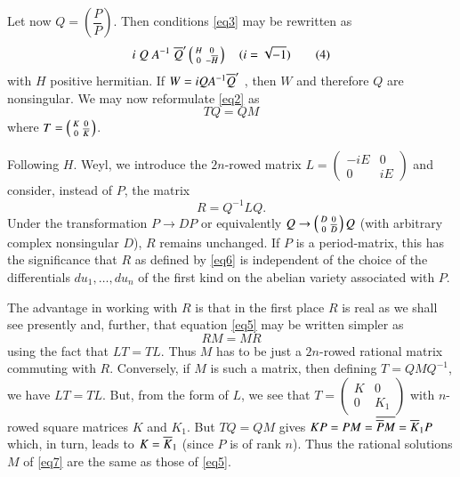 Let now $Q=\left(\dfrac{P}{P}\right)$. Then conditions \eqref{eq3} may be
rewritten as 
\begin{equation*}
i \;Q \;A^{-1} \;\overline{Q}' \left(\begin{smallmatrix} H & 0 \\ 0 &
  -\overline{H} \end{smallmatrix} \right) \quad (i=\sqrt{-1}) \tag{4}\label{eq4}
\end{equation*}
with $H$ positive hermitian. If $W=i Q A^{-1}\overline{Q}'$ , then $W$ and
therefore $Q$ are nonsingular. We may now reformulate \eqref{eq2} as
\begin{equation*}
T Q = Q M \tag{5}\label{eq5}
\end{equation*}
where $T = \left(\begin{smallmatrix} K & 0 \\ 0 &
  \overline{K} \end{smallmatrix} \right)$.

Following $H$. Weyl, we introduce the $2n$-rowed matrix
$L=\left(\begin{smallmatrix} -iE & 0 \\ 0 & iE \end{smallmatrix}
\right)$  and consider, instead of $P$, the matrix
\begin{equation*} 
R = Q^{-1} L Q. \tag{6}\label{eq6}
\end{equation*}\pageoriginale
Under the transformation $P\rightarrow D P$ or equivalently
$Q\rightarrow \left(\begin{smallmatrix} D & 0 \\ 0 &
 \overline{D} \end{smallmatrix} \right) Q$ (with arbitrary complex
nonsingular $D$), $R$ remains unchanged. If $P$ is a period-matrix,
this has the significance that $R$ as defined by \eqref{eq6} is independent of
the choice of the differentials $du_1,\ldots, du_n$ of the first kind
on the abelian variety associated with $P$.

The advantage in working with $R$ is that in the first place $R$ is
real as we shall see presently and, further, that equation \eqref{eq5} may be
written simpler as
\begin{equation*}
R M = M R \tag{7}\label{eq7}
\end{equation*}
using the fact that $L T = T L$. Thus $M$ has to be just a $2n$-rowed
rational matrix commuting with $R$. Conversely, if $M$ is such a
matrix, then defining $T=Q M Q^{-1}$, we have $L T = T L$. But, from
the form of $L$, we see that $T= \left(\begin{smallmatrix} K & 0 \\ 0 &
 K_1\end{smallmatrix} \right)$ with $n$-rowed square matrices $K$ and
 $K_1$. But $T Q = Q M$ gives $K P = P M = \overline{\overline{P}M} = \overline{K}_1 P$
 which, in turn, leads to $K=\overline{K}_1$ (since $P$ is of rank
 $n$). Thus the rational solutions $M$ of \eqref{eq7} are the same as those of
 \eqref{eq5}.

